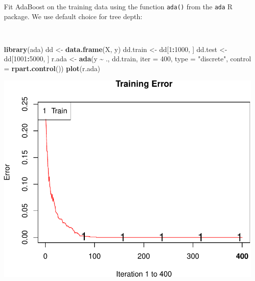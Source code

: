 \documentclass[
  10pt,
  ignorenonframetext,
]{beamer}
\newenvironment{Shaded}{\begin{snugshade}}{\end{snugshade}}
\newcommand{\AttributeTok}[1]{\textcolor[rgb]{0.13,0.29,0.53}{#1}}
\newcommand{\DecValTok}[1]{\textcolor[rgb]{0.00,0.00,0.81}{#1}}
\newcommand{\FunctionTok}[1]{\textcolor[rgb]{0.13,0.29,0.53}{\textbf{#1}}}
\newcommand{\NormalTok}[1]{#1}
\newcommand{\OtherTok}[1]{\textcolor[rgb]{0.56,0.35,0.01}{#1}}
\newcommand{\SpecialCharTok}[1]{\textcolor[rgb]{0.81,0.36,0.00}{\textbf{#1}}}
\newcommand{\StringTok}[1]{\textcolor[rgb]{0.31,0.60,0.02}{#1}}
\begin{document}
\begin{frame}[fragile]
Fit AdaBoost on the training data using the function \texttt{ada()} from
the \texttt{ada} R package. We use default choice for tree depth:

\(~\)

\centering

\scriptsize

\begin{Shaded}
\begin{Highlighting}[]
\FunctionTok{library}\NormalTok{(ada)}
\NormalTok{dd }\OtherTok{\textless{}{-}} \FunctionTok{data.frame}\NormalTok{(X, y)}
\NormalTok{dd.train }\OtherTok{\textless{}{-}}\NormalTok{ dd[}\DecValTok{1}\SpecialCharTok{:}\DecValTok{1000}\NormalTok{, ]}
\NormalTok{dd.test }\OtherTok{\textless{}{-}}\NormalTok{ dd[}\DecValTok{1001}\SpecialCharTok{:}\DecValTok{5000}\NormalTok{, ]}
\NormalTok{r.ada }\OtherTok{\textless{}{-}} \FunctionTok{ada}\NormalTok{(y }\SpecialCharTok{\textasciitilde{}}\NormalTok{ ., dd.train, }\AttributeTok{iter =} \DecValTok{400}\NormalTok{, }\AttributeTok{type =} \StringTok{"discrete"}\NormalTok{, }\AttributeTok{control =} \FunctionTok{rpart.control}\NormalTok{())}
\FunctionTok{plot}\NormalTok{(r.ada)}
\end{Highlighting}
\end{Shaded}

\includegraphics[width=0.6\linewidth]{9TreeBost_files/figure-beamer/unnamed-chunk-2-1}
\end{frame}
\end{document}
